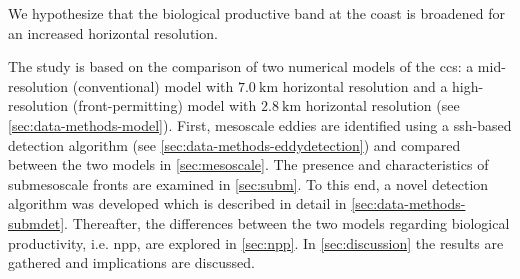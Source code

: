 \begin{hypothesis}
We hypothesize that the biological productive band at the coast is broadened for an increased horizontal resolution.\label{hypo:h3}
\end{hypothesis}

The study is based on the comparison of two numerical models of the \ac{ccs}: a mid-resolution (conventional) model with $\SI{7.0}{\kilo\metre}$ horizontal resolution and a high-resolution (front-permitting) model with $\SI{2.8}{\kilo\metre}$ horizontal resolution (see \autoref{sec:data-methods-model}). First, mesoscale eddies are identified using a \ac{ssh}-based detection algorithm (see \autoref{sec:data-methods-eddydetection}) and compared between the two models in \autoref{sec:mesoscale}. The presence and characteristics of submesoscale fronts are examined in \autoref{sec:subm}. To this end, a novel detection algorithm was developed which is described in detail in \autoref{sec:data-methods-submdet}. Thereafter, the differences between the two models regarding biological productivity, i.e. \ac{npp}, are explored in \autoref{sec:npp}. In \autoref{sec:discussion} the results are gathered and implications are discussed.